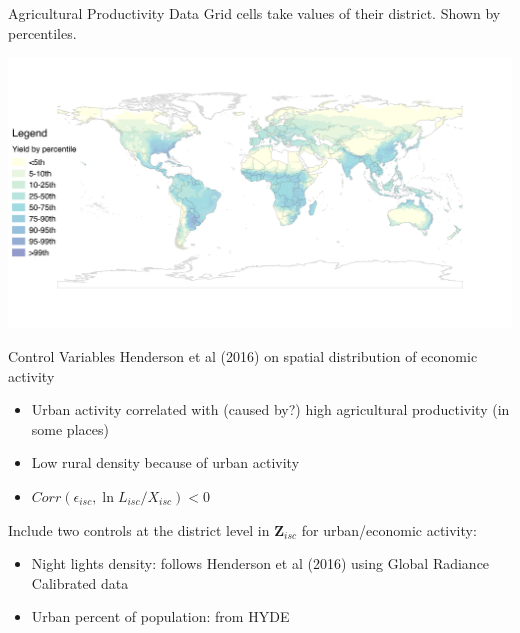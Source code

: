 \documentclass[10pt, xcolor=dvipsnames]{beamer}
\begin{document}
\begin{frame}{Agricultural Productivity Data}
Grid cells take values of their district. Shown by percentiles.
\vspace{-.5in}
\begin{center}
\includegraphics[scale=.5]{fig_csi_yield_map.png}
\end{center}
\end{frame}

\begin{frame}{Control Variables}
Henderson et al (2016) on spatial distribution of economic activity
\begin{itemize}
  \item Urban activity correlated with (caused by?) high agricultural productivity (in some places)
  \item Low rural density because of urban activity
  \item $Corr(\epsilon_{isc},\ln L_{isc}/X_{isc})<0$
\end{itemize}

Include two controls at the district level in $\mathbf{Z}_{isc}$ for urban/economic activity:
\begin{itemize}
  \item Night lights density: follows Henderson et al (2016) using Global Radiance Calibrated data
  \item Urban percent of population: from HYDE
\end{itemize}

\end{frame}
\end{document}
